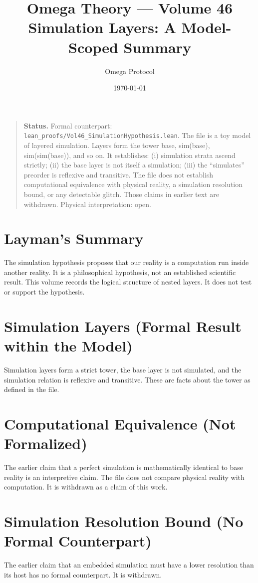 \documentclass[11pt, a4paper]{article}
\title{Omega Theory --- Volume 46\\\Large Simulation Layers: A Model-Scoped Summary}
\author{Omega Protocol}
\date{\today}
\begin{document}
\maketitle

\begin{quote}
\textbf{Status.} Formal counterpart: \texttt{lean\_proofs/Vol46\_SimulationHypothesis.lean}. The file is a toy model of layered simulation. Layers form the tower base, sim(base), sim(sim(base)), and so on. It establishes: (i) simulation strata ascend strictly; (ii) the base layer is not itself a simulation; (iii) the ``simulates'' preorder is reflexive and transitive. The file does not establish computational equivalence with physical reality, a simulation resolution bound, or any detectable glitch. Those claims in earlier text are withdrawn. Physical interpretation: open.
\end{quote}

\section*{Layman's Summary}
The simulation hypothesis proposes that our reality is a computation run inside another reality. It is a philosophical hypothesis, not an established scientific result. This volume records the logical structure of nested layers. It does not test or support the hypothesis.

\section{Simulation Layers (Formal Result within the Model)}
Simulation layers form a strict tower, the base layer is not simulated, and the simulation relation is reflexive and transitive. These are facts about the tower as defined in the file.

\section{Computational Equivalence (Not Formalized)}
The earlier claim that a perfect simulation is mathematically identical to base reality is an interpretive claim. The file does not compare physical reality with computation. It is withdrawn as a claim of this work.

\section{Simulation Resolution Bound (No Formal Counterpart)}
The earlier claim that an embedded simulation must have a lower resolution than its host has no formal counterpart. It is withdrawn.
\end{document}
